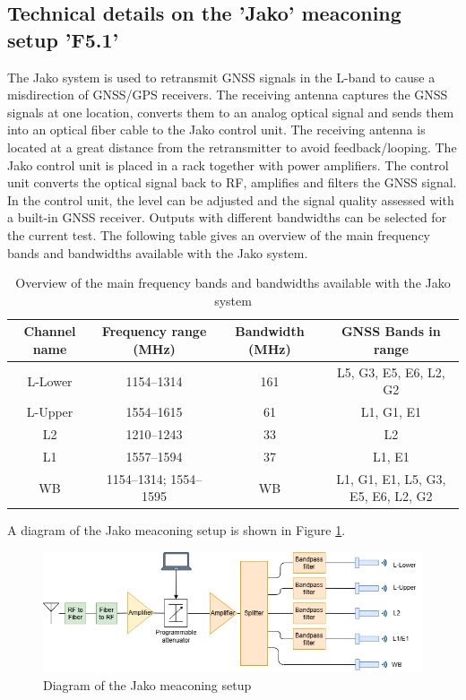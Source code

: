 \subsection{Technical details on the 'Jako' meaconing setup 'F5.1'}
The Jako system is used to retransmit GNSS signals in the L-band to cause a misdirection of GNSS/GPS receivers. The receiving antenna captures the GNSS signals at one location, converts them to an analog optical signal and sends them into an optical fiber cable to the Jako control unit. The receiving antenna is located at a great distance from the retransmitter to avoid feedback/looping.
The Jako control unit is placed in a rack together with power amplifiers. The control unit converts the optical signal back to RF, amplifies and filters the GNSS signal. In the control unit, the level can be adjusted and the signal quality assessed with a built-in GNSS receiver. Outputs with different bandwidths can be selected for the current test. The following table gives an overview of the main frequency bands and bandwidths available with the Jako system.

\begin{table}[H]
\begin{tabular}{|c|c|c|c|}
\hline
\rowcolor[HTML]{C0C0C0}
\textbf{Channel name} & \textbf{Frequency range (MHz)} & \textbf{Bandwidth (MHz)} & \textbf{GNSS Bands in range} \\
\hline
L-Lower & 1154--1314 & 161 & L5, G3, E5, E6, L2, G2  \\
\hline
L-Upper & 1554--1615 & 61 & L1, G1, E1 \\
\hline
L2 & 1210--1243 & 33 & L2 \\
\hline
L1 & 1557--1594 & 37 & L1, E1 \\
\hline
WB & 1154--1314; 1554--1595 & WB & L1, G1, E1, L5, G3, E5, E6, L2, G2 \\
\hline
\end{tabular}
\caption{Overview of the main frequency bands and bandwidths available with the Jako system}
\end{table}

A diagram of the Jako meaconing setup is shown in Figure \ref{fig:Jako system}.
\begin{figure}[H]
    \includegraphics[width=\textwidth]{graphics/appendixG/Jako.png}
    \caption{Diagram of the Jako meaconing setup}
    \label{fig:Jako system}
\end{figure}

\newpage
